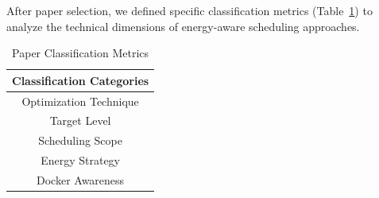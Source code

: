 \documentclass[runningheads]{llncs}
\begin{document}
After paper selection, we defined specific classification metrics (Table~\ref{tab:Paper Classification}) to analyze the technical dimensions of energy-aware scheduling approaches.

\begin{table}[H]
\centering
\begin{tabular}{c}
\hline
Classification Categories\\ \hline
Optimization Technique \\ 
Target Level  \\ 
Scheduling Scope \\ 
Energy Strategy \\
Docker Awareness \\
\hline
\end{tabular}
    \caption{Paper Classification Metrics}
    \label{tab:Paper Classification}
\end{table}
\end{document}
